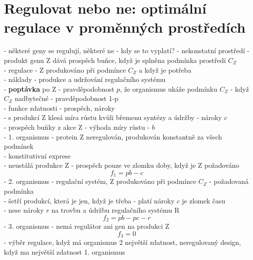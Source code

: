 \documentclass[11pt,a4paper]{report}
\begin{document}
\section{Regulovat nebo ne: optimální regulace v proměnných prostředích}
- některé geny se regulují, některé ne - kdy se to vyplatí?
- nekonstatní prostředí - produkt genu Z dává prospěch buňce, když je splněna podmínka prostředí $C_Z$\\
- regulace - Z produkováno při podmínce $C_Z$ a když je potřeba\\ 
\indent - náklady - produkce a udržování regulačního systému\\
\indent - \textbf{poptávka} po Z - pravděpodobnost $p$, že organismus ukáže podmínku $C_Z$
\indent \indent - když $C_Z$ nadbytečné - pravděpodobnost 1-p\\
- funkce zdatnosti - prospěch, nároky\\
\indent - s produkcí Z klesá míra růstu kvůli břemenu syntézy a údržby - nároky $c$\\
\indent - prospěch buňky z akce Z - výhoda míry růstu - $b$\\
- 1. organismus - protein Z neregulován, produkován konstantně za všech podmínek\\
\indent - konstitutivní exprese\\
\indent - neustálá produkce Z - prospěch pouze ve zlomku doby, když je Z požadováno\\
\begin{equation}
f_1=pb-c
\end{equation}
- 2. organismus - regulační systém, Z produkováno při podmínce $C_Z$ - požadovaná podmínka\\
\indent - šetří produkcí, která je jen, když je třeba - platí nároky $c$ je zlomek času\\
\indent - nese nároky $r$ na trovbu a údržbu regulačního systému R\\
\begin{equation}
f_2=pb-pc-r
\end{equation}
- 3. organismus - nemá regulátor ani gen na produkci Z\\
\begin{equation}
f_3=0
\end{equation}
- výběr regulace, když má organismus 2 největší zdatnost, neregulovaný design, když ma největší zdatnost 1. organismus\\
\end{document}
